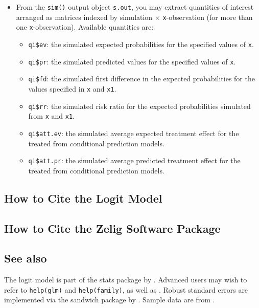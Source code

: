 \begin{itemize}
\item From the {\tt sim()} output object {\tt s.out}, you may extract
  quantities of interest arranged as matrices indexed by simulation
  $\times$ {\tt x}-observation (for more than one {\tt x}-observation).
  Available quantities are:

   \begin{itemize}
   \item {\tt qi\$ev}: the simulated expected probabilities for the
     specified values of {\tt x}.
   \item {\tt qi\$pr}: the simulated predicted values for the
     specified values of {\tt x}.
   \item {\tt qi\$fd}: the simulated first difference in the expected
     probabilities for the values specified in {\tt x} and {\tt x1}.
   \item {\tt qi\$rr}: the simulated risk ratio for the expected
     probabilities simulated from {\tt x} and {\tt x1}.
   \item {\tt qi\$att.ev}: the simulated average expected treatment
     effect for the treated from conditional prediction models.  
   \item {\tt qi\$att.pr}: the simulated average predicted treatment
     effect for the treated from conditional prediction models.  
   \end{itemize}
\end{itemize}






\subsection*{How to Cite the Logit Model}

\subsection*{How to Cite the Zelig Software Package}
\CiteZelig


\subsection*{See also}
The logit model is part of the stats package by \citet{VenRip02}.
Advanced users may wish to refer to \texttt{help(glm)} and
\texttt{help(family)}, as well as \cite{McCNel89}. Robust standard
errors are implemented via the sandwich package by \citet{Zeileis04}.
Sample data are from \cite{KinTomWit00}.
